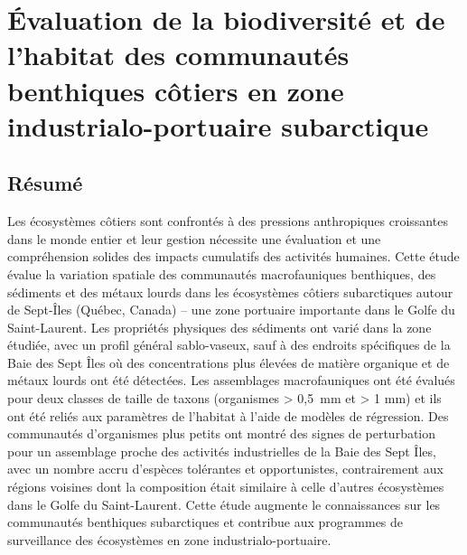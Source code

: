 \chapter{Évaluation de la biodiversité et de l'habitat des communautés benthiques côtiers en zone industrialo-portuaire subarctique}
\label{chap1}

\section{Résumé}
Les écosystèmes côtiers sont confrontés à des pressions anthropiques croissantes dans le monde entier et leur gestion nécessite une évaluation et une compréhension solides des impacts cumulatifs des activités humaines. Cette étude évalue la variation spatiale des communautés macrofauniques benthiques, des sédiments et des métaux lourds dans les écosystèmes côtiers subarctiques autour de Sept-Îles (Québec, Canada) -- une zone portuaire importante dans le Golfe du Saint-Laurent. Les propriétés physiques des sédiments ont varié dans la zone étudiée, avec un profil général sablo-vaseux, sauf à des endroits spécifiques de la Baie des Sept Îles où des concentrations plus élevées de matière organique et de métaux lourds ont été détectées. Les assemblages macrofauniques ont été évalués pour deux classes de taille de taxons (organismes > 0,5 mm et > 1 mm) et ils ont été reliés aux paramètres de l'habitat à l'aide de modèles de régression. Des communautés d'organismes plus petits ont montré des signes de perturbation pour un assemblage proche des activités industrielles de la Baie des Sept Îles, avec un nombre accru d'espèces tolérantes et opportunistes, contrairement aux régions voisines dont la composition était similaire à celle d'autres écosystèmes dans le Golfe du Saint-Laurent. Cette étude augmente le connaissances sur les communautés benthiques subarctiques et contribue aux programmes de surveillance des écosystèmes en zone industrialo-portuaire. \linebreak[4]

